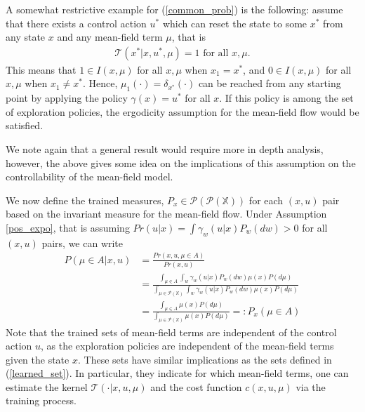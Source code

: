 \documentclass[twoside,11pt]{article}
\def\P{{\mathcal P}}
\begin{document}
\begin{remark}
A somewhat restrictive example for (\ref{common_prob}) is the following: assume that there exists a control action $u^*$ which can reset the state to some $x^*$ from any state $x$ and any mean-field term $\mu$, that is 
\begin{align*}
\mathcal{T}(x^*|x,u^*,\mu)=1 \text{ for all } x,\mu.
\end{align*}
This means that $1\in I(x,\mu)$ for all $x,\mu$ when $x_1=x^*$, and $0\in I(x,\mu)$ for all $x,\mu$ when $x_1\neq x^*$. Hence, $\mu_1(\cdot)= \delta_{x^*}(\cdot)$ can be reached from any starting point by applying the policy $\gamma(x)=u^*$ for all $x$. If this policy is among the set of exploration policies, the ergodicity assumption for the mean-field flow would be satisfied.  

We note again that a general result would require more in depth analysis, however, the above gives some idea on the implications of this assumption on the controllability of the mean-field model.
\end{remark}




We now define the trained measures, $P_{x} \in \P(\P(\mathds{X}))$ for each $(x,u)$ pair based on the invariant measure for the mean-field flow. Under Assumption \ref{pos_expo}, that is assuming $Pr(u|x)=\int \gamma_w(u|x)P_w(dw)>0$ for all $(x,u)$ pairs, we can write
\begin{align}\label{learned_set_ind}
    P(\mu\in A|x,u)&=\frac{Pr(x,u,\mu\in A)}{Pr(x,u)}\nonumber\\
    &=\frac{\int_{\mu\in A} \int_w \gamma_w(u|x)P_w(dw)\mu(x) P(d\mu) }{\int_{\mu\in \P(\mathds{X})} \int_w \gamma_w(u|x)P_w(dw)\mu(x) P(d\mu) }\nonumber\\
    &=\frac{\int_{\mu\in A} \mu(x) P(d\mu) }{\int_{\mu\in \P(\mathds{X})} \mu(x) P(d\mu) }=:P_x(\mu\in A)
\end{align}
Note that the trained sets of mean-field terms are independent of the control action $u$, as the exploration policies are independent of the mean-field terms given the state $x$. These sets have similar implications as the sets defined in (\ref{learned_set}). In particular, they indicate for which mean-field terms, one can estimate the kernel $\mathcal{T}(\cdot|x,u,\mu)$ and the cost function $c(x,u,\mu)$ via the training process. 
\end{document}
